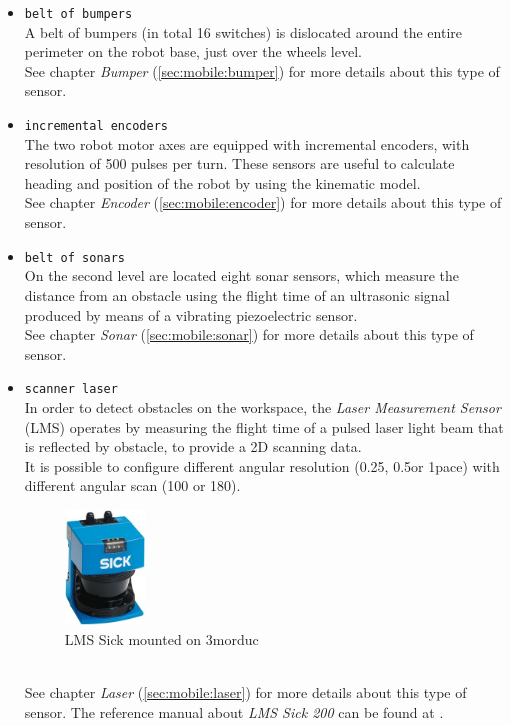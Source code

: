 \begin{itemize}
\item \texttt{belt of bumpers} \\
  A belt of bumpers (in total 16 switches) is dislocated around
  the entire perimeter on the robot base, just over the wheels level. \\
  See chapter \textit{Bumper} (\ref{sec:mobile:bumper}) for more details
  about this type of sensor.

\item \texttt{incremental encoders} \\
  The two robot motor axes are equipped with incremental encoders, with
  resolution of 500 pulses per turn. These sensors are useful to calculate
  heading and position of the robot by using the kinematic model. \\  
  See chapter \textit{Encoder} (\ref{sec:mobile:encoder}) for more details
  about this type of sensor.
 
\item \texttt{belt of sonars} \\
  On the second level are located eight sonar sensors, which measure the
  distance from an obstacle using the flight time of an ultrasonic signal
  produced by means of a vibrating piezoelectric sensor. \\
  See chapter \textit{Sonar} (\ref{sec:mobile:sonar}) for more details
  about this type of sensor.

\item \texttt{scanner laser} \\
  In order to detect obstacles on the workspace, the \textit{Laser Measurement
  Sensor} (LMS) operates by measuring the flight time of a pulsed laser
  light beam that is reflected by obstacle, to provide a 2D scanning data. \\
  It is possible to configure different angular resolution (0.25\textdegree,
  0.5\textdegree or 1\textdegree pace) with different angular scan (100\textdegree
  or 180\textdegree).
  \begin{figure}[h]
    \begin{center}
      \includegraphics[width=60pt]{img/laser_sick_lms_200.jpg}
      \caption{LMS Sick mounted on 3morduc}
      \label{fig:laser_sick_lms_200}
    \end{center}
  \end{figure}
  \\
  See chapter \textit{Laser} (\ref{sec:mobile:laser}) for more details
  about this type of sensor. The reference manual about \textit{LMS
  Sick 200} can be found at \cite{3morduc:laser_sick_200}.


\end{itemize}
